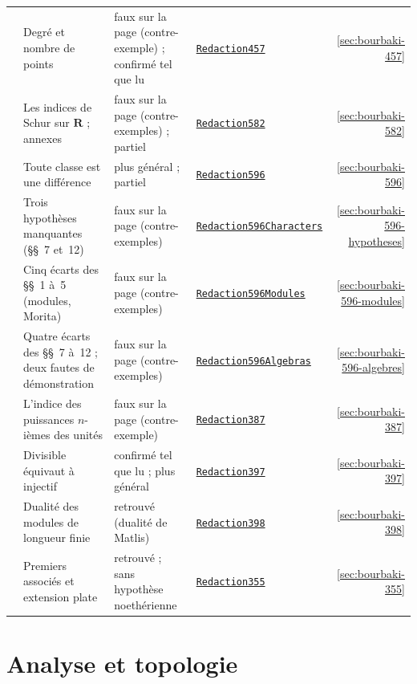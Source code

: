 \documentclass[11pt]{article}
\newcommand{\leanblobmain}{https://github.com/Commutator-IO/grothendieck-project/blob/main/lean/Bourbaki}
\theoremstyle{plain}
\theoremstyle{definition}
\theoremstyle{plain}
\theoremstyle{definition}
\theoremstyle{remark}
\renewcommand{\_}{\bkunderscore\allowbreak}
\begin{document}
\begin{center}
{\begin{longtable}{@{}>{\raggedright\arraybackslash}p{1.2cm}>{\raggedright\arraybackslash}p{6.3cm}>{\raggedright\arraybackslash}p{3.6cm}>{\raggedright\arraybackslash}p{2.6cm}r@{}}
457 & Degré et nombre de points & faux sur la page (contre-exemple) ; confirmé tel que lu & \href{\leanblobmain/Redaction457.lean}{\texttt{Redaction457}} & \ref{sec:bourbaki-457}\\
582 & Les indices de Schur sur $\mathbf R$ ; annexes & faux sur la page (contre-exemples) ; partiel & \href{\leanblobmain/Redaction582.lean}{\texttt{Redaction582}} & \ref{sec:bourbaki-582}\\
596 & Toute classe est une différence & plus général ; partiel & \href{\leanblobmain/Redaction596.lean}{\texttt{Redaction596}} & \ref{sec:bourbaki-596}\\
596 & Trois hypothèses manquantes (§§~7 et~12) & faux sur la page (contre-exemples) & \href{\leanblobmain/Redaction596Characters.lean}{\texttt{Redaction596\allowbreak{}Characters}} & \ref{sec:bourbaki-596-hypotheses}\\
596 & Cinq écarts des §§~1 à~5 (modules, Morita) & faux sur la page (contre-exemples) & \href{\leanblobmain/Redaction596Modules.lean}{\texttt{Redaction596\allowbreak{}Modules}} & \ref{sec:bourbaki-596-modules}\\
596 & Quatre écarts des §§~7 à~12 ; deux fautes de démonstration & faux sur la page (contre-exemples) & \href{\leanblobmain/Redaction596Algebras.lean}{\texttt{Redaction596\allowbreak{}Algebras}} & \ref{sec:bourbaki-596-algebres}\\
387 & L'indice des puissances $n$-ièmes des unités & faux sur la page (contre-exemple) & \href{\leanblobmain/Redaction387.lean}{\texttt{Redaction387}} & \ref{sec:bourbaki-387}\\
397 & Divisible équivaut à injectif & confirmé tel que lu ; plus général & \href{\leanblobmain/Redaction397.lean}{\texttt{Redaction397}} & \ref{sec:bourbaki-397}\\
398 & Dualité des modules de longueur finie & retrouvé (dualité de Matlis) & \href{\leanblobmain/Redaction398.lean}{\texttt{Redaction398}} & \ref{sec:bourbaki-398}\\
355 & Premiers associés et extension plate & retrouvé ; sans hypothèse noethérienne & \href{\leanblobmain/Redaction355.lean}{\texttt{Redaction355}} & \ref{sec:bourbaki-355}\\
\bottomrule
\end{longtable}}
\end{center}

\part{Analyse et topologie}












\end{document}
